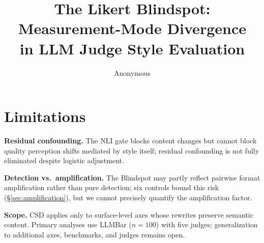 \documentclass[11pt]{article}
\title{The Likert Blindspot: Measurement-Mode Divergence\\in LLM Judge Style Evaluation}
\author{Anonymous}
\begin{document}
\maketitle













\section*{Limitations}
\label{sec:limitations}

\noindent\textbf{Residual confounding.}
The NLI gate blocks content changes but cannot block quality perception shifts mediated by style itself; residual confounding is not fully eliminated despite logistic adjustment.

\noindent\textbf{Detection vs.\ amplification.}
The Blindspot may partly reflect pairwise format amplification \citep{jeong2025comparative} rather than pure detection; six controls bound this risk (\S\ref{sec:amplification}), but we cannot precisely quantify the amplification factor.

\noindent\textbf{Scope.}
CSD applies only to surface-level axes whose rewrites preserve semantic content. Primary analyses use LLMBar ($n = 100$) with five judges; generalization to additional axes, benchmarks, and judges remains open.




\end{document}
